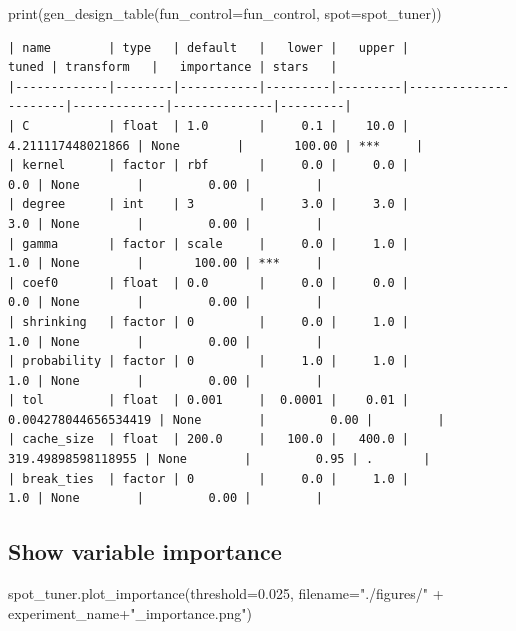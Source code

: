 \documentclass[
  letterpaper,
  DIV=11,
  numbers=noendperiod]{scrreprt}
\newenvironment{Shaded}{\begin{snugshade}}{\end{snugshade}}
\newcommand{\BuiltInTok}[1]{\textcolor[rgb]{0.00,0.23,0.31}{#1}}
\newcommand{\FloatTok}[1]{\textcolor[rgb]{0.68,0.00,0.00}{#1}}
\newcommand{\NormalTok}[1]{\textcolor[rgb]{0.00,0.23,0.31}{#1}}
\newcommand{\OperatorTok}[1]{\textcolor[rgb]{0.37,0.37,0.37}{#1}}
\newcommand{\StringTok}[1]{\textcolor[rgb]{0.13,0.47,0.30}{#1}}
\begin{document}
\begin{Shaded}
\begin{Highlighting}[]
\BuiltInTok{print}\NormalTok{(gen\_design\_table(fun\_control}\OperatorTok{=}\NormalTok{fun\_control,}
\NormalTok{    spot}\OperatorTok{=}\NormalTok{spot\_tuner))}
\end{Highlighting}
\end{Shaded}

\begin{verbatim}
| name        | type   | default   |   lower |   upper |                tuned | transform   |   importance | stars   |
|-------------|--------|-----------|---------|---------|----------------------|-------------|--------------|---------|
| C           | float  | 1.0       |     0.1 |    10.0 |    4.211117448021866 | None        |       100.00 | ***     |
| kernel      | factor | rbf       |     0.0 |     0.0 |                  0.0 | None        |         0.00 |         |
| degree      | int    | 3         |     3.0 |     3.0 |                  3.0 | None        |         0.00 |         |
| gamma       | factor | scale     |     0.0 |     1.0 |                  1.0 | None        |       100.00 | ***     |
| coef0       | float  | 0.0       |     0.0 |     0.0 |                  0.0 | None        |         0.00 |         |
| shrinking   | factor | 0         |     0.0 |     1.0 |                  1.0 | None        |         0.00 |         |
| probability | factor | 0         |     1.0 |     1.0 |                  1.0 | None        |         0.00 |         |
| tol         | float  | 0.001     |  0.0001 |    0.01 | 0.004278044656534419 | None        |         0.00 |         |
| cache_size  | float  | 200.0     |   100.0 |   400.0 |   319.49898598118955 | None        |         0.95 | .       |
| break_ties  | factor | 0         |     0.0 |     1.0 |                  1.0 | None        |         0.00 |         |
\end{verbatim}

\hypertarget{show-variable-importance-3}{%
\subsection{Show variable importance}\label{show-variable-importance-3}}

\begin{Shaded}
\begin{Highlighting}[]
\NormalTok{spot\_tuner.plot\_importance(threshold}\OperatorTok{=}\FloatTok{0.025}\NormalTok{, filename}\OperatorTok{=}\StringTok{"./figures/"} \OperatorTok{+}\NormalTok{ experiment\_name}\OperatorTok{+}\StringTok{"\_importance.png"}\NormalTok{)}
\end{Highlighting}
\end{Shaded}
\end{document}
